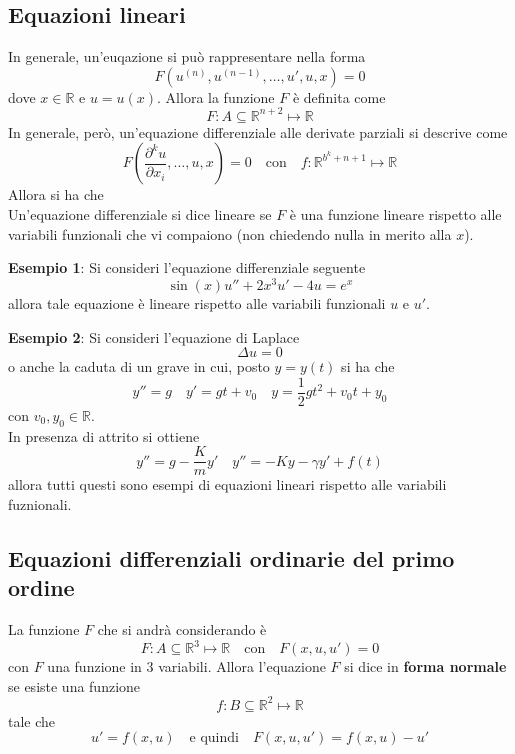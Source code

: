 \documentclass[a4paper]{extarticle}
\begin{document}
\vspace{1em}
\subsection{Equazioni lineari}
In generale, un'euqazione si può rappresentare nella forma
\[F\left(u^{(n)}, u^{(n-1)}, \dots, u', u, x\right)=0\]
dove $x \in \mathbb{R}$ e $u=u(x)$. Allora la funzione $F$ è definita come
\[F : A \subseteq \mathbb{R}^{n+2} \longmapsto \mathbb{R}\]
In generale, però, un'equazione differenziale alle derivate parziali si descrive come
\[F \left(\dfrac{\partial^k u}{\partial x_i},\dots,u,x\right) = 0 \hspace{1em} \text{con} \hspace{1em} f : \mathbb{R}^{b^k+n+1} \longmapsto \mathbb{R}\]
Allora si ha che\\
Un'equazione differenziale si dice lineare se $F$ è una funzione lineare rispetto alle variabili funzionali che vi compaiono (non chiedendo nulla in merito alla $x$).

\vspace{2em}
\noindent
\textbf{Esempio 1}: Si consideri l'equazione differenziale seguente
\[\sin(x) u'' + 2x^3 u' - 4u = e^x\]
allora tale equazione è lineare rispetto alle variabili funzionali $u$ e $u'$.

\vspace{2em}
\noindent
\textbf{Esempio 2}: Si consideri l'equazione di Laplace
\[\Delta u = 0\]
o anche la caduta di un grave in cui, posto $y=y(t)$ si ha che
\[y''=g \hspace{1em} y'=gt+v_0 \hspace{1em} y = \dfrac{1}{2} g t^2 + v_0 t + y_0\]
con $v_0,y_0 \in \mathbb{R}$.\\
In presenza di attrito si ottiene
\[y''=g-\dfrac{K}{m} y' \hspace{1em} y'' = -Ky - \gamma y' + f(t)\]
allora tutti questi sono esempi di equazioni lineari rispetto alle variabili fuznionali.

\vspace{1em}
\subsection{Equazioni differenziali ordinarie del primo ordine}
La funzione $F$ che si andrà considerando è
\[F : A \subseteq \mathbb{R}^3 \longmapsto \mathbb{R} \hspace{1em} \text{con} \hspace{1em} F(x,u,u')=0\]
con $F$ una funzione in $3$ variabili. Allora l'equazione $F$ si dice in \textbf{forma normale} se esiste una funzione
\[f : B \subseteq \mathbb{R}^2 \longmapsto \mathbb{R}\]
tale che
\[u'=f(x,u) \hspace{1em} \text{e quindi} \hspace{1em} F(x,u,u') = f(x,u)-u'\]
\end{document}

